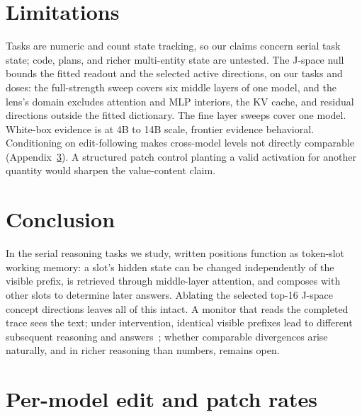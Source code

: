\documentclass{article}
\begin{document}
\section{Limitations}
\label{sec:limits}

Tasks are numeric and count state tracking, so our claims concern serial task state; code, plans, and richer multi-entity state are untested. The J-space null bounds the fitted readout and the selected active directions, on our tasks and doses: the full-strength sweep covers six middle layers of one model, and the lens's domain excludes attention and MLP interiors, the KV cache, and residual directions outside the fitted dictionary. The fine layer sweeps cover one model. White-box evidence is at 4B to 14B scale, frontier evidence behavioral. Conditioning on edit-following makes cross-model levels not directly comparable (Appendix~\ref{app:table}). A structured patch control planting a valid activation for another quantity would sharpen the value-content claim.

\section{Conclusion}

In the serial reasoning tasks we study, written positions function as token-slot working memory: a slot's hidden state can be changed independently of the visible prefix, is retrieved through middle-layer attention, and composes with other slots to determine later answers. Ablating the selected top-16 J-space concept directions leaves all of this intact. A monitor that reads the completed trace sees the text; under intervention, identical visible prefixes lead to different subsequent reasoning and answers~\citep{korbak2025monitor}; whether comparable divergences arise naturally, and in richer reasoning than numbers, remains open.

{\footnotesize
\setlength{\bibsep}{2.5pt}


}

\appendix

\section{Per-model edit and patch rates}
\label{app:table}
\end{document}
